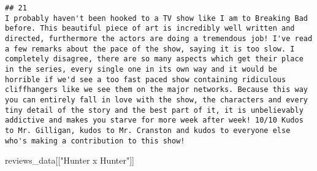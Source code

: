 \documentclass[
]{article}
\newenvironment{Shaded}{\begin{snugshade}}{\end{snugshade}}
\newcommand{\NormalTok}[1]{#1}
\newcommand{\StringTok}[1]{\textcolor[rgb]{0.31,0.60,0.02}{#1}}
\begin{document}
\begin{verbatim}
## 21                                                                                                                                                                                                                                                                                                                                                                                                                                                                                                                                                                                                                                                                                                                                                                                                                                                                                                                                                                                                                                                                                                                                                                                                                                                                                                                        I probably haven't been hooked to a TV show like I am to Breaking Bad before. This beautiful piece of art is incredibly well written and directed, furthermore the actors are doing a tremendous job! I've read a few remarks about the pace of the show, saying it is too slow. I completely disagree, there are so many aspects which get their place in the series, every single one in its own way and it would be horrible if we'd see a too fast paced show containing ridiculous cliffhangers like we see them on the major networks. Because this way you can entirely fall in love with the show, the characters and every tiny detail of the story and the best part of it, it is unbelievably addictive and makes you starve for more week after week! 10/10 Kudos to Mr. Gilligan, kudos to Mr. Cranston and kudos to everyone else who's making a contribution to this show!
\end{verbatim}

\begin{Shaded}
\begin{Highlighting}[]
\NormalTok{reviews\_data[[}\StringTok{"Hunter x Hunter"}\NormalTok{]]}
\end{Highlighting}
\end{Shaded}
\end{document}
